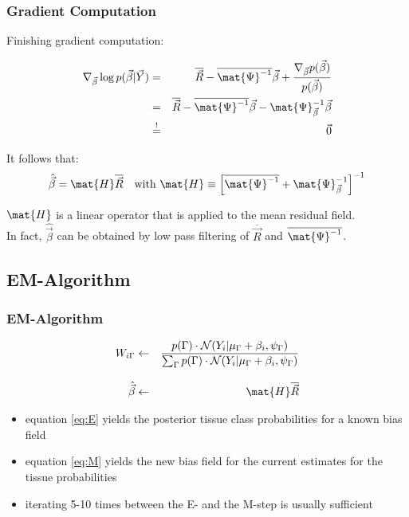\begin{frame}
  \frametitle{Gradient Computation \cont}

  Finishing gradient computation:

  {\small
  \begin{eqnarray*}
    \nabla_{\vec \beta} \log p(\vec \beta | \vec Y) 
      &=& \overline{\vec R} - \overline{\mat{\Psi}^{-1}} \vec \beta + \frac{\nabla_{\vec \beta} p(\vec \beta)}{p(\vec \beta)} \\
      &=& \overline{\vec R} - \overline{\mat{\Psi}^{-1}} \vec \beta - \mat{\Psi}_{\vec{\beta}}^{-1} \vec \beta \\
      &\stackrel{!}{=}& \vec{0}
  \end{eqnarray*}
  }
  \pause 
  
  It follows that:
  {\small
  \begin{displaymath}
    \hat{\vec \beta} = \mat{H} \overline{\vec R} \quad \mbox{with}~ 
    \mat{H} \equiv \left[\overline{\mat{\Psi}^{-1}} + \mat{\Psi}_{\vec{\beta}}^{-1} \right]^{-1}
  \end{displaymath}
  }
  \pause 
  
  $\mat{H}$ is a linear operator that is applied to the mean residual field. \\
  In fact, $\hat{\vec{\beta}}$ can be obtained by low pass filtering of $\overline{\vec R}$ and $\overline{\mat{\Psi}^{-1}}$.
\end{frame}


\subsection{EM-Algorithm}

\begin{frame}
  \frametitle{EM-Algorithm}


  \begin{eqnarray}
    W_{i\Gamma} 
    &\leftarrow& \frac{p(\Gamma) \cdot \mathcal{N}(Y_i | \mu_\Gamma + \beta_i, \psi_\Gamma)}
                      {\sum_\Gamma p(\Gamma) \cdot \mathcal{N} (Y_i | \mu_\Gamma + \beta_i, \psi_\Gamma)} \label{eq:E} \\[.3cm]
    \hat{\vec \beta} 
    &\leftarrow& \mat{H} \overline{\vec R} \label{eq:M}
  \end{eqnarray}
  \pause 
  
  \begin{itemize}
    \item {} equation \eqref{eq:E} yields the posterior tissue class probabilities for a known bias field \pause 
    \item {} equation \eqref{eq:M} yields the new bias field for the current estimates for the tissue probabilities \pause
    \item {} iterating 5-10 times between the E- and the M-step is usually sufficient
  \end{itemize}
\end{frame}


